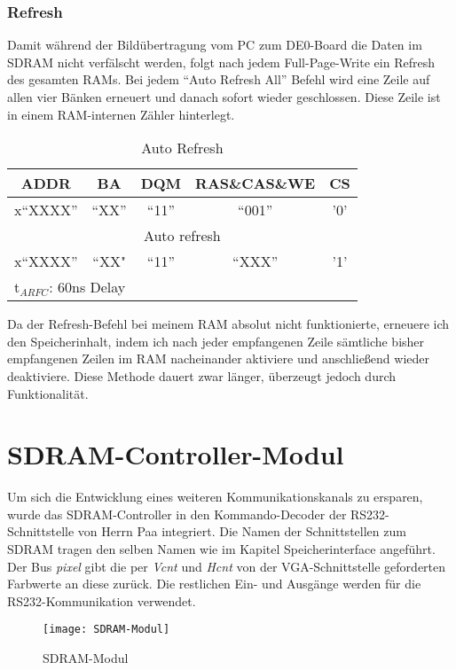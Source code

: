 \subsubsection*{Refresh}

Damit während der Bildübertragung vom PC zum DE0-Board die Daten im SDRAM nicht verfälscht werden, folgt nach jedem Full-Page-Write ein Refresh des gesamten RAMs. Bei jedem "`Auto Refresh All"' Befehl wird eine Zeile auf allen vier Bänken erneuert und danach sofort wieder geschlossen. Diese Zeile ist in einem RAM-internen Zähler hinterlegt.

\begin{table}[h!]
\caption{Auto Refresh}
\label{tab:ref-seq}
\centering
\setlength{\tabcolsep}{1ex}
\def\arraystretch{1.20}
\setlength{\tabcolsep}{1ex}
\small
\begin{tabularx}{\textwidth}{|ccccc|}
\hline 
ADDR & BA & DQM & RAS\&CAS\&WE & CS\\ 
\hline 
x``XXXX'' & ``XX'' & ``11'' & ``001'' & '0'\\
\multicolumn{5}{|X|}{Auto refresh} \\ 
\hline 
x``XXXX'' & ``XX" & ``11'' & ``XXX'' & '1'  \\ 
\multicolumn{5}{|l|}{t$_{ARFC}$: 60ns Delay} \\
\hline 
\end{tabularx} 
\end{table}
\FloatBarrier

Da der Refresh-Befehl bei meinem RAM absolut nicht funktionierte, erneuere ich den Speicherinhalt, indem ich nach jeder empfangenen Zeile sämtliche bisher empfangenen Zeilen im RAM nacheinander aktiviere und anschließend wieder deaktiviere. Diese Methode dauert zwar länger, überzeugt jedoch durch Funktionalität.
\newpage
\section{SDRAM-Controller-Modul}



Um sich die Entwicklung eines weiteren Kommunikationskanals zu ersparen, wurde das SDRAM-Controller in den Kommando-Decoder der RS232-Schnittstelle von Herrn Paa integriert. Die Namen der Schnittstellen zum SDRAM tragen den selben Namen wie im Kapitel Speicherinterface angeführt. Der Bus \emph{pixel} gibt die per \emph{Vcnt} und \emph{Hcnt} von der VGA-Schnitt\-stel\-le geforderten Farbwerte an diese zurück. Die restlichen Ein- und Ausgänge werden für die RS232-Kommunikation verwendet.

%
\begin{figure}[h!]
\centering
\texttt{[image: SDRAM-Modul]} %
\caption{SDRAM-Modul}
\label{fig:RAM-M}
\end{figure}
%
\FloatBarrier
